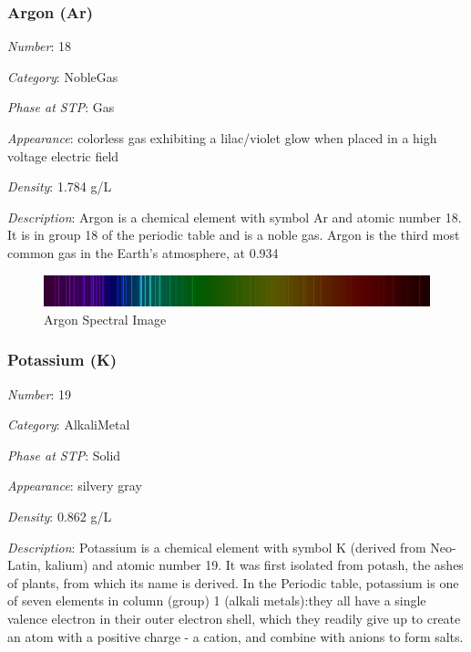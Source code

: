 \documentclass{article}
\begin{document}
\hypertarget{subsubsection::Ar}{}\subsubsection{Argon (Ar)}

\textit{Number}: 18

\textit{Category}: NobleGas

\textit{Phase at STP}: Gas

\textit{Appearance}: colorless gas exhibiting a lilac/violet glow when placed in a high voltage electric field

\textit{Density}: 1.784 g/L

\textit{Description}: Argon is a chemical element with symbol Ar and atomic number 18. It is in group 18 of the periodic table and is a noble gas. Argon is the third most common gas in the Earth's atmosphere, at 0.934%

\immediate{}
\begin{figure}[!ht]
    \centering
    \includegraphics[width=12cm]{./resources/spectral_img/Argon_Spectrum.png}
    \caption{Argon Spectral Image}
\end{figure}

\hypertarget{subsubsection::K}{}\subsubsection{Potassium (K)}

\textit{Number}: 19

\textit{Category}: AlkaliMetal

\textit{Phase at STP}: Solid

\textit{Appearance}: silvery gray

\textit{Density}: 0.862 g/L

\textit{Description}: Potassium is a chemical element with symbol K (derived from Neo-Latin, kalium) and atomic number 19. It was first isolated from potash, the ashes of plants, from which its name is derived. In the Periodic table, potassium is one of seven elements in column (group) 1 (alkali metals):they all have a single valence electron in their outer electron shell, which they readily give up to create an atom with a positive charge - a cation, and combine with anions to form salts.
\end{document}
